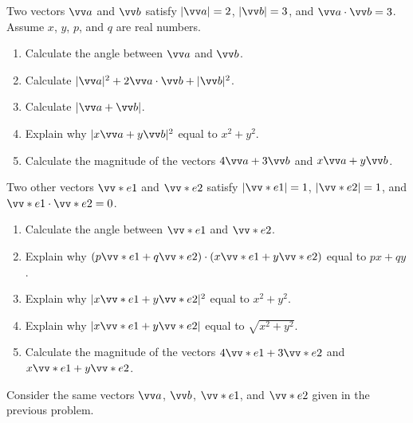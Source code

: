 \documentclass[11pt,pdfa,lastpage]{MishoNote}
\begin{document}
\begin{problems}
  \Problem[S] \relax\relax\label{q:ipbasic}%
  Two vectors $\vc a$ and $\vc b$ satisfy $|\vc a|=2$, $|\vc b|=3$, and $\vc a\cdot\vc b=3$. Assume $x$, $y$, $p$, and $q$ are real numbers.
  \begin{enumerate}
    \item Calculate the angle between $\vc a$ and $\vc b$.
    \item Calculate $|\vc a|^2+2\vc a\cdot\vc b+|\vc b|^2$.
    \item Calculate $|\vc a+\vc b|$.
    \item Explain why $|x\vc a+y\vc b|^2$  equal to $x^2+y^2$.
    \item Calculate the magnitude of the vectors $4\vc a+3\vc b$ and $x\vc a+y\vc b$.
   \end{enumerate}
  Two other vectors $\vc e_1$ and $\vc e_2$ satisfy $|\vc e_1|=1$, $|\vc e_2|=1$, and $\vc e_1\cdot\vc e_2=0$.
  \begin{enumerate}[resume]
    \item Calculate the angle between $\vc e_1$ and $\vc e_2$.
    \item Explain why $(p\vc e_1+q\vc e_2)\cdot(x\vc e_1+y\vc e_2)$  equal to $px+qy$.
    \item Explain why $|x\vc e_1+y\vc e_2|^2$  equal to $x^2+y^2$.
    \item Explain why $|x\vc e_1+y\vc e_2|$  equal to $\sqrt{x^2+y^2}$.
    \item Calculate the magnitude of the vectors $4\vc e_1+3\vc e_2$ and $x\vc e_1+y\vc e_2$.
   \end{enumerate}
  \Problem[A] Consider the same vectors $\vc a$, $\vc b$, $\vc e_1$, and $\vc e_2$ given in the previous problem.


\end{problems}
\end{document}
